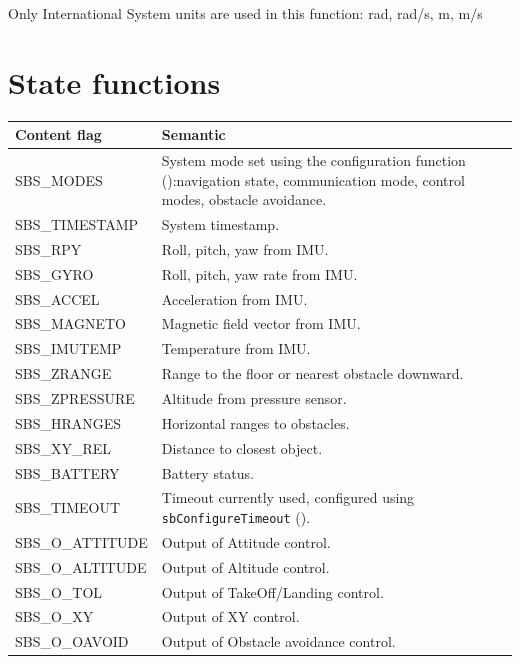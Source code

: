 \documentclass{article}
\renewcommand{\ref}[1]{\link{\htmlref{#1}}{#1}}
\newcommand{\reffun}[1]{{\tt #1} (\ref{sec:#1})}
\begin{document}
Only International System units are used in this function: rad, rad/s, m, m/s


\section{State functions}
\label{sec:state}

\begin{table}
\centering
\begin{tabular}{|l|p{}|}
\hline
Content flag & Semantic \\
\hline
\hline
SBS\_MODES         & System mode set using the configuration function
    (\ref{sec:configuration}):navigation state, communication mode, control
    modes, obstacle avoidance. \\
\hline
SBS\_TIMESTAMP     & System timestamp. \\
\hline
SBS\_RPY         & Roll, pitch, yaw from IMU. \\
\hline
SBS\_GYRO         & Roll, pitch, yaw rate from IMU. \\
\hline
SBS\_ACCEL         & Acceleration from IMU. \\
\hline
SBS\_MAGNETO     & Magnetic field vector from IMU. \\
\hline
SBS\_IMUTEMP     & Temperature from IMU. \\
\hline
SBS\_ZRANGE         & Range to the floor or nearest obstacle downward. \\
\hline
SBS\_ZPRESSURE     & Altitude from pressure sensor. \\
\hline
SBS\_HRANGES     & Horizontal ranges to obstacles. \\
\hline
SBS\_XY\_REL     & Distance to closest object. \\
\hline
SBS\_BATTERY     & Battery status. \\
\hline
SBS\_TIMEOUT     & Timeout currently used, configured using
    \reffun{sbConfigureTimeout}. \\
\hline
SBS\_O\_ATTITUDE & Output of Attitude control. \\
\hline
SBS\_O\_ALTITUDE & Output of Altitude control. \\
\hline
SBS\_O\_TOL         & Output of TakeOff/Landing control. \\
\hline
SBS\_O\_XY         & Output of XY control. \\
\hline
SBS\_O\_OAVOID     & Output of Obstacle avoidance control. \\
\hline
\hline


\end{tabular}
\end{table}
\end{document}
